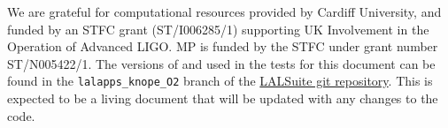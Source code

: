 \acknowledgements

We are grateful for computational resources provided by Cardiff University, and funded by an STFC grant (ST/I006285/1) supporting UK Involvement in
the Operation of Advanced LIGO. MP is funded by the STFC under grant number ST/N005422/1. The versions of \lppenf and \lppef used in the tests for this document
can be found in the {\tt lalapps\_knope\_O2} branch of the \href{https://github.com/lscsoft/lalsuite/tree/lalapps_knope_O2}{LALSuite git repository}. This is expected
to be a living document that will be updated with any changes to the code.
